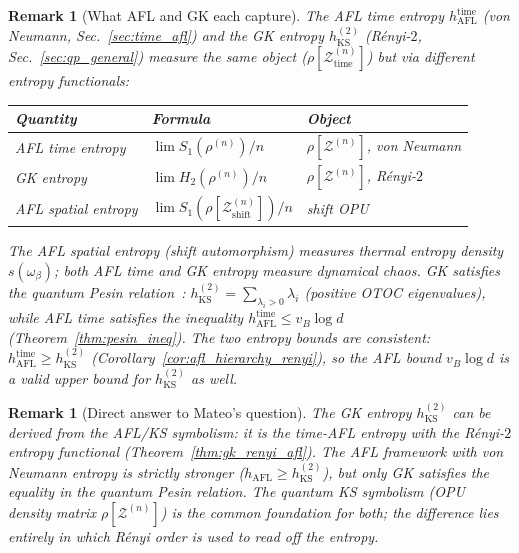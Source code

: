 \documentclass[12pt,a4paper]{article}
\newtheorem{remark}[theorem]{Remark}
\begin{document}
\begin{remark}[What AFL and GK each capture]
The AFL time entropy $h_{\mathrm{AFL}}^{\mathrm{time}}$ (von Neumann, Sec.~\ref{sec:time_afl})
and the GK entropy $h_{\mathrm{KS}}^{(2)}$ (R\'enyi-$2$,
Sec.~\ref{sec:qp_general}) measure the \emph{same object}
($\rho[\mathcal{Z}^{(n)}_{\mathrm{time}}]$) but via different entropy functionals:
\begin{center}
\begin{tabular}{lll}
\hline
Quantity & Formula & Object \\
\hline
AFL time entropy & $\lim S_1(\rho^{(n)})/n$ & $\rho[\mathcal{Z}^{(n)}]$, von Neumann \\
GK entropy & $\lim H_2(\rho^{(n)})/n$ & $\rho[\mathcal{Z}^{(n)}]$, R\'enyi-$2$ \\
AFL spatial entropy & $\lim S_1(\rho[\mathcal{Z}^{(n)}_{\mathrm{shift}}])/n$ & shift OPU \\
\hline
\end{tabular}
\end{center}
The AFL spatial entropy (shift automorphism) measures thermal entropy density
$s(\omega_\beta)$; both AFL time and GK entropy measure dynamical chaos.
GK satisfies the quantum Pesin relation~\cite{gk2021}:
$h_{\mathrm{KS}}^{(2)} = \sum_{\lambda_i>0}\lambda_i$ (positive OTOC eigenvalues),
while AFL time satisfies the inequality $h_{\mathrm{AFL}}^{\mathrm{time}} \leq v_B\log d$
(Theorem~\ref{thm:pesin_ineq}).  The two entropy bounds are consistent:
$h_{\mathrm{AFL}}^{\mathrm{time}} \geq h_{\mathrm{KS}}^{(2)}$
(Corollary~\ref{cor:afl_hierarchy_renyi}), so the AFL bound $v_B\log d$
is a valid upper bound for $h_{\mathrm{KS}}^{(2)}$ as well.
\end{remark}

\begin{remark}[Direct answer to Mateo's question]
The GK entropy $h_{\mathrm{KS}}^{(2)}$ \emph{can} be derived from the AFL/KS
symbolism: it is the time-AFL entropy with the R\'enyi-$2$ entropy functional
(Theorem~\ref{thm:gk_renyi_afl}).  The AFL framework with von Neumann entropy is
strictly stronger ($h_{\mathrm{AFL}} \geq h_{\mathrm{KS}}^{(2)}$), but only GK
satisfies the equality in the quantum Pesin relation.  The quantum KS symbolism
(OPU density matrix $\rho[\mathcal{Z}^{(n)}]$) is the common foundation for both;
the difference lies entirely in which R\'enyi order is used to read off the entropy.
\end{remark}

\end{document}
